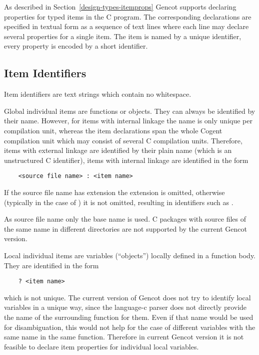 As described in Section~\ref{design-types-itemprops} Gencot supports declaring properties for typed 
items in the C program. The corresponding declarations are specified in textual form as a sequence
of text lines where each line may declare several properties for a single item. The item is
named by a unique identifier, every property is encoded by a short identifier.

\subsection{Item Identifiers}
\label{impl-itemprops-ids}

Item identifiers are text strings which contain no whitespace. 

Global individual items are functions or objects.
They can always be identified by their name. However, for items with internal linkage the name is only unique
per compilation unit, whereas the item declarations span the whole Cogent compilation unit which may consist of several C 
compilation units. Therefore, items with 
external linkage are identified by their plain name (which is an unstructured C identifier), items with
internal linkage are identified in the form
\begin{verbatim}
    <source file name> : <item name>
\end{verbatim}
If the source file name has extension  the extension is omitted, otherwise (typically in the case of )
it is not omitted, resulting in identifiers such as .

As source file name only the base name is used. C packages with source files of the same name in different directories are
not supported by the current Gencot version.

Local individual items are variables (``objects'') locally defined in a function body. They are identified in the form
\begin{verbatim}
    ? <item name>
\end{verbatim}
which is not unique. The current version of Gencot does not try to identify local variables in a unique way, since the 
language-c parser does not directly provide the name of the surrounding function for them. Even if that name would be
used for disambiguation, this would not help for the case of different variables with the same name in the same function.
Therefore in current Gencot version it is not feasible to declare item properties for individual local variables. 

